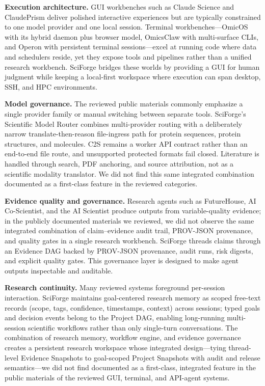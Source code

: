 \documentclass[sn-basic,Numbered,pdflatex]{sn-jnl}
\begin{document}
\textbf{Execution architecture.} GUI workbenches such as Claude Science and ClaudePrism deliver polished interactive experiences but are typically constrained to one model provider and one local session. Terminal workbenches---OmicOS with its hybrid daemon plus browser model, OmicsClaw with multi-surface CLIs, and Operon with persistent terminal sessions---excel at running code where data and schedulers reside, yet they expose tools and pipelines rather than a unified research workbench. SciForge bridges these worlds by providing a GUI for human judgment while keeping a local-first workspace where execution can span desktop, SSH, and HPC environments.

\textbf{Model governance.} The reviewed public materials commonly emphasize a single provider family or manual switching between separate tools. SciForge's Scientific Model Router combines multi-provider routing with a deliberately narrow translate-then-reason file-ingress path for protein sequences, protein structures, and molecules. C2S remains a worker API contract rather than an end-to-end file route, and unsupported protected formats fail closed. Literature is handled through search, PDF anchoring, and source attribution, not as a scientific modality translator. We did not find this same integrated combination documented as a first-class feature in the reviewed categories.

\textbf{Evidence quality and governance.} Research agents such as FutureHouse, AI Co-Scientist, and the AI Scientist produce outputs from variable-quality evidence; in the publicly documented materials we reviewed, we did not observe the same integrated combination of claim--evidence audit trail, PROV-JSON provenance, and quality gates in a single research workbench. SciForge threads claims through an Evidence DAG backed by PROV-JSON provenance, audit runs, risk digests, and explicit quality gates. This governance layer is designed to make agent outputs inspectable and auditable.

\textbf{Research continuity.} Many reviewed systems foreground per-session interaction. SciForge maintains goal-centered research memory as scoped free-text records (scope, tags, confidence, timestamps, context) across sessions; typed goals and decision events belong to the Project DAG, enabling long-running multi-session scientific workflows rather than only single-turn conversations. The combination of research memory, workflow engine, and evidence governance creates a persistent research workspace whose integrated design---tying thread-level Evidence Snapshots to goal-scoped Project Snapshots with audit and release semantics---we did not find documented as a first-class, integrated feature in the public materials of the reviewed GUI, terminal, and API-agent systems.
\end{document}
